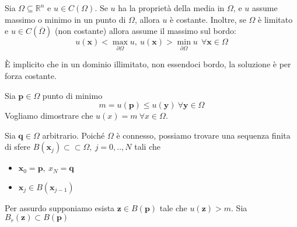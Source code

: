 \documentclass[10pt,a4paper,twoside,openright]{book}
\newcommand{\x}{\mathbf{x}}
\newcommand{\y}{\mathbf{y}}
\begin{document}
\begin{theorem}
    \label{thm:principio-di-massimo-armoniche}
    Sia $\Omega \subseteq \mathbb{R}^{n}$ e $u\in C(\Omega)$. Se $u$ ha la proprietà della media in $\Omega $, e $u$ assume massimo o minimo in un punto di $\Omega $, allora $u$ è costante. Inoltre, se $\Omega $ è limitato e $u\in C(\overline{\Omega })$ (non costante) allora assume il massimo sul bordo:
    \begin{equation*}
        u(\x) < \max_{\partial \Omega } u,\ u(\x)  >\min_{\partial \Omega } u\ \ \forall \x\in \Omega
    \end{equation*}
\end{theorem}
È implicito che in un dominio illimitato, non essendoci bordo, la soluzione è per forza costante.
\begin{dimostrazione}
    Sia $\mathbf{p}\in \Omega $ punto di minimo
    \begin{equation*}
        m=u(\mathbf{p}) \leqslant u(\y) \ \forall \y\in \Omega
    \end{equation*}
    Vogliamo dimostrare che $u(x) =m\ \forall x\in \Omega $.

    Sia $\mathbf{q}\in \Omega $ arbitrario. Poiché $\Omega $ è connesso, possiamo trovare una sequenza finita di sfere $B(\x_{j}) \subset \subset \Omega,\ j=0,..,N$ tali che
    \begin{itemize}
        \item $\x_{0} =\mathbf{p},\ x_{N} =\mathbf{q}$
        \item $\x_{j} \in B(\x_{j-1})$
    \end{itemize}
    Per assurdo supponiamo esista $\mathbf{z}\in B(\mathbf{p})$ tale che $u(\mathbf{z})  >m$. Sia $B_{r}(\mathbf{z}) \subset B(\mathbf{p})$

    \begin{figure}[H]
        \centering

        \begin{tikzpicture}[x=0.75pt,y=0.75pt,yscale=-1,xscale=1]


\end{tikzpicture}
\end{figure}
\end{dimostrazione}
\end{document}
